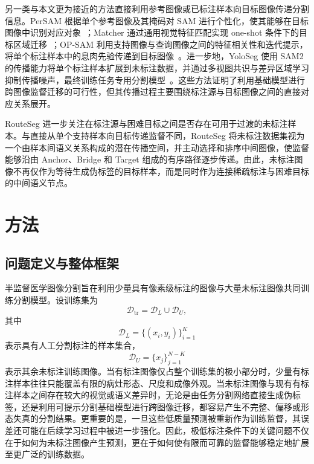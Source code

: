 \documentclass[UTF8,a4paper,10pt,twocolumn]{ctexart}
\begin{document}
另一类与本文更为接近的方法直接利用参考图像或已标注样本向目标图像传递分割信息。PerSAM 根据单个参考图像及其掩码对 SAM 进行个性化，使其能够在目标图像中识别对应对象~\cite{zhang2023persam}；Matcher 通过通用视觉特征匹配实现 one-shot 条件下的目标区域迁移~\cite{liu2023matcher}；OP-SAM 利用支持图像与查询图像之间的特征相关性和迭代提示，将单个标注样本中的息肉先验传递到目标图像~\cite{mao2025opsam}。进一步地，YoloSeg 使用 SAM2 的传播能力将单个标注样本扩展到未标注数据，并通过多视图共识与差异区域学习抑制传播噪声，最终训练任务专用分割模型~\cite{zhang2026yoloseg}。这些方法证明了利用基础模型进行跨图像监督迁移的可行性，但其传播过程主要围绕标注源与目标图像之间的直接对应关系展开。

RouteSeg 进一步关注在标注源与困难目标之间是否存在可用于过渡的未标注样本。与直接从单个支持样本向目标传递监督不同，RouteSeg 将未标注数据集视为一个由样本间语义关系构成的潜在传播空间，并主动选择和排序中间图像，使监督能够沿由 Anchor、Bridge 和 Target 组成的有序路径逐步传递。由此，未标注图像不再仅作为等待生成伪标签的目标样本，而是同时作为连接稀疏标注与困难目标的中间语义节点。





\section{方法}
\label{sec:method}









\subsection{问题定义与整体框架}
\label{sec:framework-overview-zh}

半监督医学图像分割旨在利用少量具有像素级标注的图像与大量未标注图像共同训练分割模型。设训练集为
\begin{equation}
\mathcal{D}_{\mathrm{tr}}
=
\mathcal{D}_{L}\cup\mathcal{D}_{U},
\end{equation}
其中
\begin{equation}
\mathcal{D}_{L}
=
\{(x_i,y_i)\}_{i=1}^{K}
\end{equation}
表示具有人工分割标注的样本集合，
\begin{equation}
\mathcal{D}_{U}
=
\{x_j\}_{j=1}^{N-K}
\end{equation}
表示其余未标注训练图像。当有标注图像仅占整个训练集的极小部分时，少量有标注样本往往只能覆盖有限的病灶形态、尺度和成像外观。当未标注图像与现有有标注样本之间存在较大的视觉或语义差异时，无论是由任务分割网络直接生成伪标签，还是利用可提示分割基础模型进行跨图像迁移，都容易产生不完整、偏移或形态失真的分割结果。更重要的是，一旦这些低质量预测被重新作为训练监督，其误差还可能在后续学习过程中被进一步强化。因此，极低标注条件下的关键问题不仅在于如何为未标注图像产生预测，更在于如何使有限而可靠的监督能够稳定地扩展至更广泛的训练数据。
\end{document}
